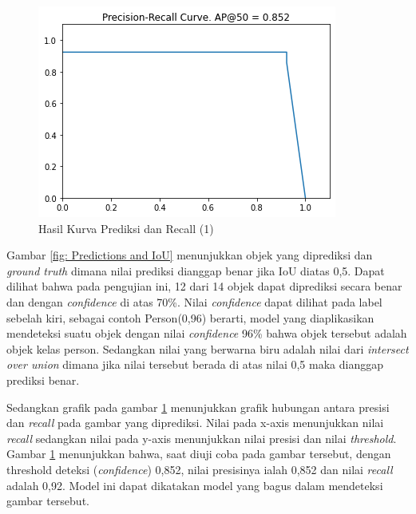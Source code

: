 \begin{figure}[h!]
  \begin{center}
    \includegraphics[width= 0.55\linewidth]{bab4/Contoh Hasil prediksi 1.5.png}
    \caption{Hasil Kurva Prediksi dan Recall (1)}
    \label{fig: line Predictions and IoU}
  \end{center}
\end{figure}

Gambar \ref{fig: Predictions and IoU} menunjukkan objek yang diprediksi dan \textit{ground truth} dimana
nilai prediksi dianggap benar jika IoU diatas 0,5. Dapat dilihat bahwa pada pengujian ini, 12 dari 14 objek
dapat diprediksi secara benar dan dengan \textit{confidence} di atas 70\%. Nilai \textit{confidence}
dapat dilihat pada label sebelah kiri, sebagai contoh Person(0,96) berarti, model yang diaplikasikan
mendeteksi suatu objek dengan nilai \textit{confidence} 96\% bahwa objek tersebut adalah objek kelas person.
Sedangkan nilai yang berwarna biru adalah nilai dari \textit{intersect over union} dimana jika nilai 
tersebut berada di atas nilai 0,5 maka dianggap prediksi benar.

Sedangkan grafik pada gambar \ref{fig: line Predictions and IoU} menunjukkan grafik hubungan antara
presisi dan \textit{recall} pada gambar yang diprediksi. Nilai pada x-axis menunjukkan nilai \textit{recall}
sedangkan nilai pada y-axis menunjukkan nilai presisi dan nilai \textit{threshold}. Gambar \ref{fig: line Predictions and IoU}
menunjukkan bahwa, saat diuji coba pada gambar tersebut, dengan threshold deteksi (\textit{confidence})
0,852, nilai presisinya ialah 0,852 dan nilai \textit{recall} adalah 0,92. Model ini dapat dikatakan model
yang bagus dalam mendeteksi gambar tersebut.


